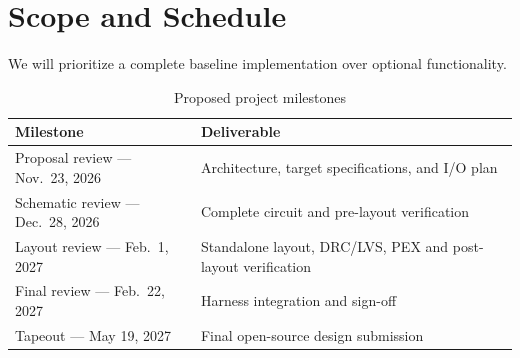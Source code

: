 
\section{Scope and Schedule}

We will prioritize a complete baseline implementation over optional functionality.

\begin{table}[htbp]
\centering
\caption{Proposed project milestones}
\label{tab:milestones}
\begin{tabularx}{\textwidth}{@{}p{}Y@{}}
\toprule
\textbf{Milestone} & \textbf{Deliverable} \\
\midrule

Proposal review --- Nov.\ 23, 2026 &
Architecture, target specifications, and I/O plan \\

Schematic review --- Dec.\ 28, 2026 &
Complete circuit and pre-layout verification \\

Layout review --- Feb.\ 1, 2027 &
Standalone layout, DRC/LVS, PEX and post-layout
verification \\

Final review --- Feb.\ 22, 2027 &
Harness integration and sign-off \\

Tapeout --- May 19, 2027 &
Final open-source design submission \\

\bottomrule
\end{tabularx}
\end{table}
